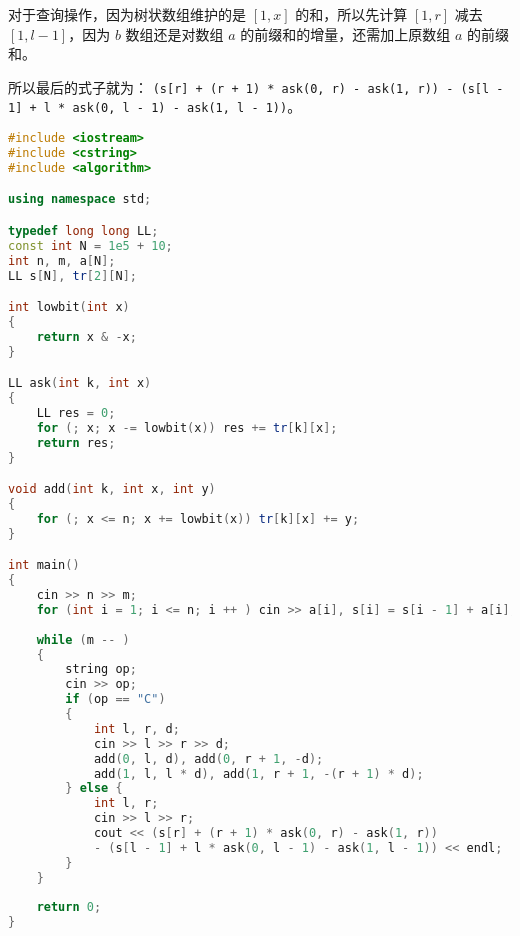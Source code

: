 对于查询操作，因为树状数组维护的是 $[1, x]$ 的和，所以先计算 $[1, r]$ 减去 $[1, l - 1]$，因为 $b$ 数组还是对数组 $a$ 的前缀和的增量，还需加上原数组 $a$ 的前缀和。

所以最后的式子就为：
\verb|(s[r] + (r + 1) * ask(0, r) - ask(1, r)) - (s[l - 1] + l * ask(0, l - 1) - ask(1, l - 1))|。

\begin{lstlisting}[language=cpp]
#include <iostream>
#include <cstring>
#include <algorithm>

using namespace std;

typedef long long LL;
const int N = 1e5 + 10;
int n, m, a[N];
LL s[N], tr[2][N];

int lowbit(int x)
{
    return x & -x;
}

LL ask(int k, int x)
{
    LL res = 0;
    for (; x; x -= lowbit(x)) res += tr[k][x];
    return res;
}

void add(int k, int x, int y)
{
    for (; x <= n; x += lowbit(x)) tr[k][x] += y;
}

int main()
{
    cin >> n >> m;
    for (int i = 1; i <= n; i ++ ) cin >> a[i], s[i] = s[i - 1] + a[i];
    
    while (m -- )
    {
        string op;
        cin >> op;
        if (op == "C")
        {
            int l, r, d;
            cin >> l >> r >> d;
            add(0, l, d), add(0, r + 1, -d);
            add(1, l, l * d), add(1, r + 1, -(r + 1) * d);
        } else {
            int l, r;
            cin >> l >> r;
            cout << (s[r] + (r + 1) * ask(0, r) - ask(1, r))
            - (s[l - 1] + l * ask(0, l - 1) - ask(1, l - 1)) << endl;
        }
    }
    
    return 0;
}
\end{lstlisting}
